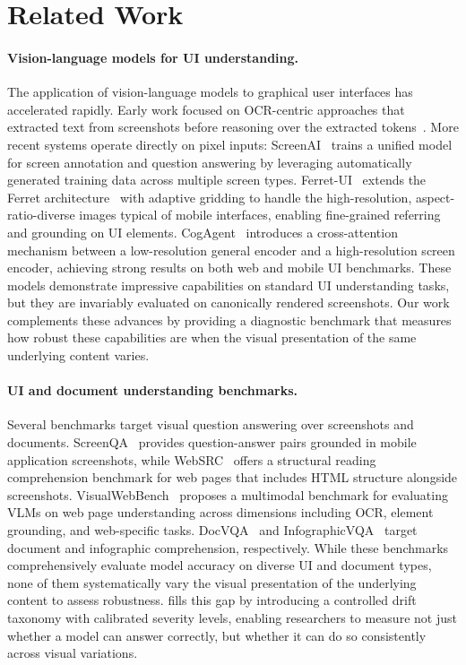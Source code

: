 \section{Related Work}
\label{sec:related}

\paragraph{Vision-language models for UI understanding.}
The application of vision-language models to graphical user interfaces has accelerated rapidly. Early work focused on OCR-centric approaches that extracted text from screenshots before reasoning over the extracted tokens~\cite{tang2023unifying}. More recent systems operate directly on pixel inputs: ScreenAI~\cite{baechler2024screenai} trains a unified model for screen annotation and question answering by leveraging automatically generated training data across multiple screen types. Ferret-UI~\cite{you2024ferretui} extends the Ferret architecture~\cite{you2023ferret} with adaptive gridding to handle the high-resolution, aspect-ratio-diverse images typical of mobile interfaces, enabling fine-grained referring and grounding on UI elements. CogAgent~\cite{hong2024cogagent} introduces a cross-attention mechanism between a low-resolution general encoder and a high-resolution screen encoder, achieving strong results on both web and mobile UI benchmarks. These models demonstrate impressive capabilities on standard UI understanding tasks, but they are invariably evaluated on canonically rendered screenshots. Our work complements these advances by providing a diagnostic benchmark that measures how robust these capabilities are when the visual presentation of the same underlying content varies.

\paragraph{UI and document understanding benchmarks.}
Several benchmarks target visual question answering over screenshots and documents. ScreenQA~\cite{hsiao2022screenqa} provides question-answer pairs grounded in mobile application screenshots, while WebSRC~\cite{chen2021websrc} offers a structural reading comprehension benchmark for web pages that includes HTML structure alongside screenshots. VisualWebBench~\cite{liu2024visualwebbench} proposes a multimodal benchmark for evaluating VLMs on web page understanding across dimensions including OCR, element grounding, and web-specific tasks. DocVQA~\cite{mathew2021docvqa} and InfographicVQA~\cite{mathew2022infographicvqa} target document and infographic comprehension, respectively. While these benchmarks comprehensively evaluate model accuracy on diverse UI and document types, none of them systematically vary the visual presentation of the underlying content to assess robustness. \bench{} fills this gap by introducing a controlled drift taxonomy with calibrated severity levels, enabling researchers to measure not just whether a model can answer correctly, but whether it can do so consistently across visual variations.

